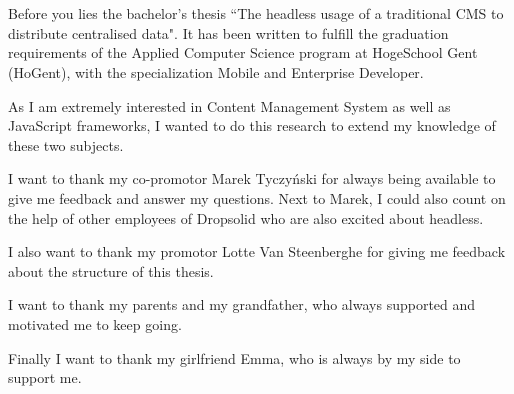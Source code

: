 
\chapter*{}
\label{ch:voorwoord}


Before you lies the bachelor's thesis “The headless usage of a traditional CMS to distribute centralised data". It has been written to fulfill the graduation requirements of the Applied Computer Science program at HogeSchool Gent (HoGent), with the specialization Mobile and Enterprise Developer.

As I am extremely interested in Content Management System as well as JavaScript frameworks, I wanted to do this research to extend my knowledge of these two subjects.

I want to thank my co-promotor Marek Tyczyński for always being available to give me feedback and answer my questions. Next to Marek, I could also count on the help of other employees of Dropsolid who are also excited about headless.

I also want to thank my promotor Lotte Van Steenberghe for giving me feedback about the structure of this thesis.

I want to thank my parents and my grandfather, who always supported and motivated me to keep going.

Finally I want to thank my girlfriend Emma, who is always by my side to support me.



